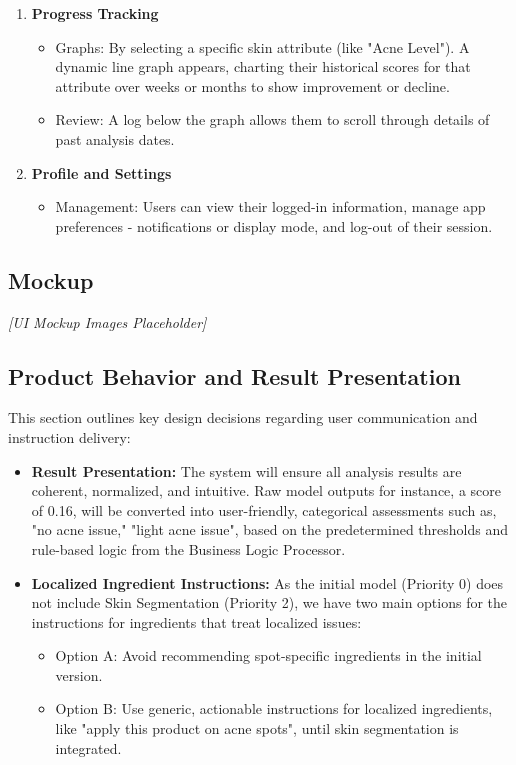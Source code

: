 \documentclass[12pt,a4paper]{article}
\begin{document}
\begin{enumerate}
\begin{itemize}
        \item Review: The users can share their current skin state, when selecting an answer a popup will show where they can fill in more details.
    \end{itemize}
    \item \textbf{Progress Tracking}
    \begin{itemize}
        \item Graphs: By selecting a specific skin attribute (like "Acne Level"). A dynamic line graph appears, charting their historical scores for that attribute over weeks or months to show improvement or decline.
        \item Review: A log below the graph allows them to scroll through details of past analysis dates.
    \end{itemize}
    \item \textbf{Profile and Settings}
    \begin{itemize}
        \item Management: Users can view their logged-in information, manage app preferences - notifications or display mode, and log-out of their session.
    \end{itemize}
\end{enumerate}

\subsection{Mockup}
\textit{[UI Mockup Images Placeholder]}

\subsection{Product Behavior and Result Presentation}
This section outlines key design decisions regarding user communication and instruction delivery:
\begin{itemize}
    \item \textbf{Result Presentation:} The system will ensure all analysis results are coherent, normalized, and intuitive. Raw model outputs for instance, a score of 0.16, will be converted into user-friendly, categorical assessments such as, "no acne issue," "light acne issue", based on the predetermined thresholds and rule-based logic from the Business Logic Processor.
    \item \textbf{Localized Ingredient Instructions:} As the initial model (Priority 0) does not include Skin Segmentation (Priority 2), we have two main options for the instructions for ingredients that treat localized issues:
    \begin{itemize}
        \item Option A: Avoid recommending spot-specific ingredients in the initial version.
        \item Option B: Use generic, actionable instructions for localized ingredients, like "apply this product on acne spots", until skin segmentation is integrated.
    \end{itemize}
\end{itemize}
\end{document}
